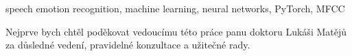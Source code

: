 \documentclass[FM,BP]{tulthesis}
\begin{document}
\begin{keywordsEN}
speech emotion recognition, machine learning, neural networks, PyTorch, MFCC
\end{keywordsEN}

\clearpage

\begin{acknowledgement} %
Nejprve bych chtěl poděkovat vedoucímu této práce panu doktoru Lukáši Matějů za důsledné vedení, pravidelné konzultace a užitečné rady.
\end{acknowledgement}

\tableofcontents

\renewcommand{\listfigurename}{Seznam obrázků}
\renewcommand{\listtablename}{Seznam tabulek}

\thispagestyle{empty}
\listoffigures
\listoftables
\end{document}
